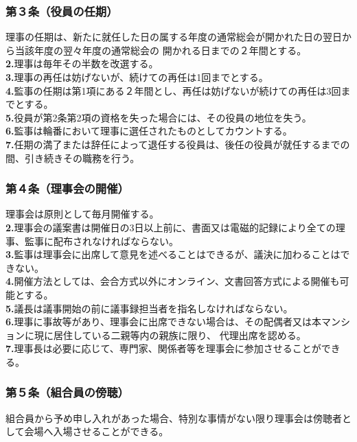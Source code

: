 \documentclass[
  luatex,
  paper=a4paper,
  fontsize=11pt,
  jafontsize=11pt,
  jlreq_notes,
]{jlreq}
\begin{document}
  \subsubsection*{ 第３条（役員の任期）}
  理事の任期は、新たに就任した日の属する年度の通常総会が開かれた日の翌日から当該年度の翌々年度の通常総会の
  開かれる日までの２年間とする。\\
  \textbf{2.}理事は毎年その半数を改選する。\\
  \textbf{3.}理事の再任は妨げないが、続けての再任は1回までとする。\\
  \textbf{4.}監事の任期は第1項にある２年間とし、再任は妨げないが続けての再任は3回までとする。\\
  \textbf{5.}役員が第2条第2項の資格を失った場合には、その役員の地位を失う。\\
  \textbf{6.}監事は輪番において理事に選任されたものとしてカウントする。\\
  \textbf{7.}任期の満了または辞任によって退任する役員は、後任の役員が就任するまでの間、引き続きその職務を行う。
  \subsubsection*{ 第４条（理事会の開催）}
  理事会は原則として毎月開催する。\\
  \textbf{2.}理事会の議案書は開催日の3日以上前に、書面又は電磁的記録により全ての理事、監事に配布されなければならない。\\
  \textbf{3.}監事は理事会に出席して意見を述べることはできるが、議決に加わることはできない。\\
  \textbf{4.}開催方法としては、会合方式以外にオンライン、文書回答方式による開催も可能とする。\\
  \textbf{5.}議長は議事開始の前に議事録担当者を指名しなければならない。\\
  \textbf{6.}理事に事故等があり、理事会に出席できない場合は、その配偶者又は本マンションに現に居住している二親等内の親族に限り、
  代理出席を認める。\\
  \textbf{7.}理事長は必要に応じて、専門家、関係者等を理事会に参加させることができる。
  \subsubsection*{ 第５条（組合員の傍聴）}
  組合員から予め申し入れがあった場合、特別な事情がない限り理事会は傍聴者として会場へ入場させることができる。
\end{document}
